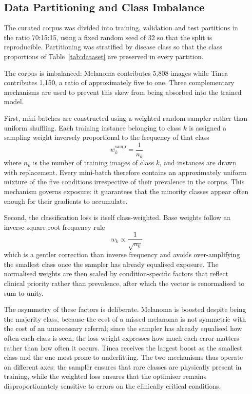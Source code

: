 \documentclass[pdflatex,sn-mathphys-num]{sn-jnl}%
\begin{document}
\subsection{Data Partitioning and Class Imbalance}\label{sec:imbalance}

The curated corpus was divided into training, validation and test partitions in the ratio
70:15:15, using a fixed random seed of 32 so that the split is reproducible. Partitioning was
stratified by disease class so that the class proportions of Table~\ref{tab:dataset} are
preserved in every partition.

The corpus is imbalanced: Melanoma contributes 5,808 images while Tinea contributes 1,150, a
ratio of approximately five to one. Three complementary mechanisms are used to prevent this
skew from being absorbed into the trained model.

First, mini-batches are constructed using a weighted random sampler rather than uniform
shuffling. Each training instance belonging to class $k$ is assigned a sampling weight
inversely proportional to the frequency of that class
\begin{equation}
w^{\mathrm{samp}}_{k} = \frac{1}{n_{k}}
\end{equation}
where $n_{k}$ is the number of training images of class $k$, and instances are drawn with
replacement. Every mini-batch therefore contains an approximately uniform mixture of the five
conditions irrespective of their prevalence in the corpus. This mechanism governs exposure:
it guarantees that the minority classes appear often enough for their gradients to accumulate.

Second, the classification loss is itself class-weighted. Base weights follow an inverse
square-root frequency rule
\begin{equation}
w_{k} \propto \frac{1}{\sqrt{n_{k}}}
\end{equation}
which is a gentler correction than inverse frequency and avoids over-amplifying the smallest
class once the sampler has already equalised exposure. The normalised weights are then scaled
by condition-specific factors that reflect clinical priority rather than prevalence, after
which the vector is renormalised to sum to unity.

The asymmetry of these factors is deliberate. Melanoma is boosted despite being the majority
class, because the cost of a missed melanoma is not symmetric with the cost of an unnecessary
referral; since the sampler has already equalised how often each class is seen, the loss
weight expresses how much each error matters rather than how often it occurs. Tinea receives
the largest boost as the smallest class and the one most prone to underfitting. The two
mechanisms thus operate on different axes: the sampler ensures that rare classes are
physically present in training, while the weighted loss ensures that the optimiser remains
disproportionately sensitive to errors on the clinically critical conditions.
\end{document}
